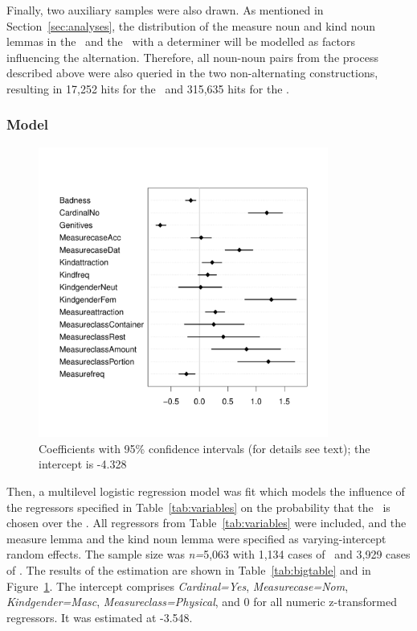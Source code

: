 Finally, two auxiliary samples were also drawn.
As mentioned in Section~\ref{sec:analyses}, the distribution of the measure noun and kind noun lemmas in the \NACb\ and the \PGCd\ with a determiner will be modelled as factors influencing the alternation.
Therefore, all noun-noun pairs from the process described above were also queried in the two non-alternating constructions, resulting in 17,252 hits for the \PGCd\ and 315,635 hits for the \NACb.

\subsubsection{Model}

\begin{figure}[hb!]
  \centering
  \includegraphics[width=0.85\textwidth]{../R/output/corpus_fixeffs}
  \caption{Coefficients with 95\% confidence intervals (for details see text); the intercept is -4.328}
  \label{fig:fixeffs}
\end{figure}

Then, a multilevel logistic regression model was fit which models the influence of the regressors specified in Table~\ref{tab:variables} on the probability that the \PGCa\ is chosen over the \NACa.
All regressors from Table~\ref{tab:variables} were included, and the measure lemma and the kind noun lemma were specified as varying-intercept random effects.
The sample size was \textit{n=}5,063 with 1,134 cases of \PGCa\ and 3,929 cases of \NACa.
The results of the estimation are shown in Table~\ref{tab:bigtable} and in Figure~\ref{fig:fixeffs}.
The intercept comprises \textit{Cardinal=Yes}, \textit{Measurecase=Nom}, \textit{Kindgender=Masc}, \textit{Measureclass=Physical}, and 0 for all numeric z-transformed regressors.
It was estimated at -3.548.

